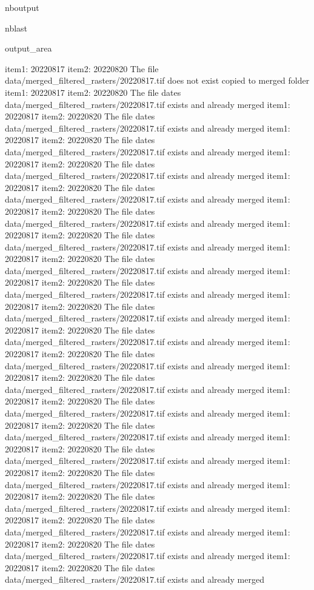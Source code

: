 \documentclass[letterpaper,10pt]{sphinxmanual}
\begin{document}
\begin{sphinxuseclass}{nboutput}
\begin{sphinxuseclass}{nblast}
{\begin{sphinxuseclass}{output_area}
\begin{sphinxuseclass}{}
\begin{sphinxVerbatim}[commandchars=\\\{\}]
item1:  20220817
item2:  20220820
The file data/merged\_filtered\_rasters/20220817.tif does not exist copied to merged folder
item1:  20220817
item2:  20220820
The file dates data/merged\_filtered\_rasters/20220817.tif exists and already merged
item1:  20220817
item2:  20220820
The file dates data/merged\_filtered\_rasters/20220817.tif exists and already merged
item1:  20220817
item2:  20220820
The file dates data/merged\_filtered\_rasters/20220817.tif exists and already merged
item1:  20220817
item2:  20220820
The file dates data/merged\_filtered\_rasters/20220817.tif exists and already merged
item1:  20220817
item2:  20220820
The file dates data/merged\_filtered\_rasters/20220817.tif exists and already merged
item1:  20220817
item2:  20220820
The file dates data/merged\_filtered\_rasters/20220817.tif exists and already merged
item1:  20220817
item2:  20220820
The file dates data/merged\_filtered\_rasters/20220817.tif exists and already merged
item1:  20220817
item2:  20220820
The file dates data/merged\_filtered\_rasters/20220817.tif exists and already merged
item1:  20220817
item2:  20220820
The file dates data/merged\_filtered\_rasters/20220817.tif exists and already merged
item1:  20220817
item2:  20220820
The file dates data/merged\_filtered\_rasters/20220817.tif exists and already merged
item1:  20220817
item2:  20220820
The file dates data/merged\_filtered\_rasters/20220817.tif exists and already merged
item1:  20220817
item2:  20220820
The file dates data/merged\_filtered\_rasters/20220817.tif exists and already merged
item1:  20220817
item2:  20220820
The file dates data/merged\_filtered\_rasters/20220817.tif exists and already merged
item1:  20220817
item2:  20220820
The file dates data/merged\_filtered\_rasters/20220817.tif exists and already merged
item1:  20220817
item2:  20220820
The file dates data/merged\_filtered\_rasters/20220817.tif exists and already merged
item1:  20220817
item2:  20220820
The file dates data/merged\_filtered\_rasters/20220817.tif exists and already merged
item1:  20220817
item2:  20220820
The file dates data/merged\_filtered\_rasters/20220817.tif exists and already merged
item1:  20220817
item2:  20220820
The file dates data/merged\_filtered\_rasters/20220817.tif exists and already merged
item1:  20220817
item2:  20220820
The file dates data/merged\_filtered\_rasters/20220817.tif exists and already merged
item1:  20220817
item2:  20220820
The file dates data/merged\_filtered\_rasters/20220817.tif exists and already merged
item1:  20220817
item2:  20220820
The file dates data/merged\_filtered\_rasters/20220817.tif exists and already merged

\end{sphinxVerbatim}
\end{sphinxuseclass}
\end{sphinxuseclass}}
\end{sphinxuseclass}
\end{sphinxuseclass}
\end{document}
